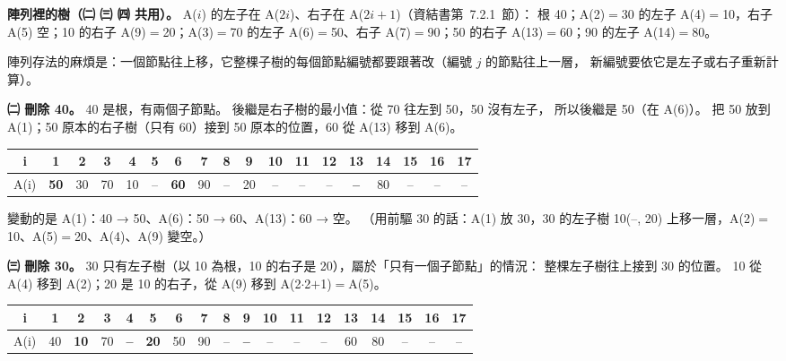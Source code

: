 \begin{pastsoln}
\textbf{陣列裡的樹（㈡ ㈢ ㈣ 共用）。} A($i$) 的左子在 A($2i$)、右子在 A($2i+1$)（資結書第~7.2.1~節）：
根 40；A(2)$=$30 的左子 A(4)$=$10，右子 A(5) 空；10 的右子 A(9)$=$20；A(3)$=$70 的左子 A(6)$=$50、右子
A(7)$=$90；50 的右子 A(13)$=$60；90 的左子 A(14)$=$80。
\begin{center}
\end{center}
陣列存法的麻煩是：一個節點往上移，它整棵子樹的每個節點編號都要跟著改（編號 $j$ 的節點往上一層，
新編號要依它是左子或右子重新計算）。

\textbf{㈡ 刪除 40。} 40 是根，有兩個子節點。 後繼是右子樹的最小值：從 70 往左到 50，50 沒有左子，
所以後繼是 50（在 A(6)）。 把 50 放到 A(1)；50 原本的右子樹（只有 60）接到 50 原本的位置，60 從
A(13) 移到 A(6)。
\begin{center}
\small
\begin{tabular}{|c|*{17}{c|}}
\hline
i & 1 & 2 & 3 & 4 & 5 & 6 & 7 & 8 & 9 & 10 & 11 & 12 & 13 & 14 & 15 & 16 & 17 \\
\hline
A(i) & \textbf{50} & 30 & 70 & 10 & -- & \textbf{60} & 90 & -- & 20 & -- & -- & -- & \textbf{--} & 80 & -- & -- & -- \\
\hline
\end{tabular}
\end{center}
變動的是 A(1)：40 → 50、A(6)：50 → 60、A(13)：60 → 空。 （用前驅 30 的話：A(1) 放 30，30 的左子樹
10(--, 20) 上移一層，A(2)$=$10、A(5)$=$20、A(4)、A(9) 變空。）

\textbf{㈢ 刪除 30。} 30 只有左子樹（以 10 為根，10 的右子是 20），屬於「只有一個子節點」的情況：
整棵左子樹往上接到 30 的位置。 10 從 A(4) 移到 A(2)；20 是 10 的右子，從 A(9) 移到 A(2$\cdot$2$+$1)$=$A(5)。
\begin{center}
\small
\begin{tabular}{|c|*{17}{c|}}
\hline
i & 1 & 2 & 3 & 4 & 5 & 6 & 7 & 8 & 9 & 10 & 11 & 12 & 13 & 14 & 15 & 16 & 17 \\
\hline
A(i) & 40 & \textbf{10} & 70 & \textbf{--} & \textbf{20} & 50 & 90 & -- & \textbf{--} & -- & -- & -- & 60 & 80 & -- & -- & -- \\
\hline
\end{tabular}
\end{center}


\end{pastsoln}
